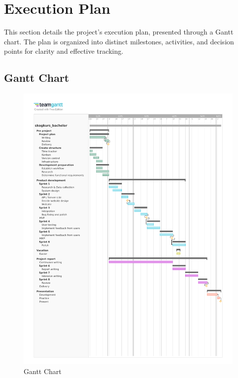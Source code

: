 \section{Execution Plan}

This section details the project's execution plan, presented through a Gantt chart. The plan is organized into distinct milestones, activities, and decision points for clarity and effective tracking.

\subsection{Gantt Chart}

\begin{figure}[H]
    \centering
    \includegraphics[width=1.0\linewidth, trim=0 60mm 0 20mm, clip]{Images/skogkurs_bachelor_gantt.pdf}
    \caption{Gantt Chart}
    \label{fig:gantt}
\end{figure}

